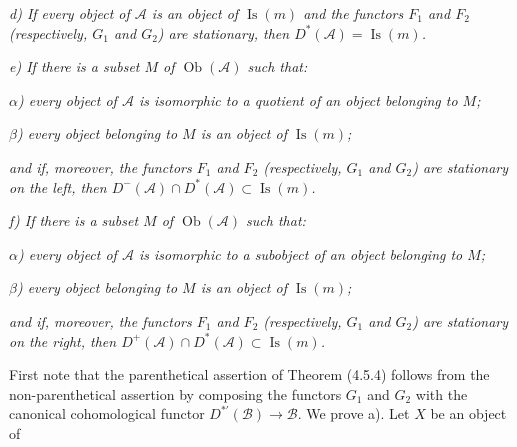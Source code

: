 \noindent\textit{d) If every object of $\mathcal A$ is an object of
$\operatorname{Is}(m)$ and the functors $F_1$ and $F_2$ (respectively,
$G_1$ and $G_2$) are stationary, then
$D^*(\mathcal A)=\operatorname{Is}(m)$.}

\noindent\textit{e) If there is a subset $M$ of
$\operatorname{Ob}(\mathcal A)$ such that:}

\noindent\textit{$\alpha$) every object of $\mathcal A$ is isomorphic to a
quotient of an object belonging to $M$;}

\noindent\textit{$\beta$) every object belonging to $M$ is an object of
$\operatorname{Is}(m)$;}

\noindent\textit{and if, moreover, the functors $F_1$ and $F_2$
(respectively, $G_1$ and $G_2$) are stationary on the left, then
$D^-(\mathcal A)\cap D^*(\mathcal A)\subset\operatorname{Is}(m)$.}

\noindent\textit{f) If there is a subset $M$ of
$\operatorname{Ob}(\mathcal A)$ such that:}

\noindent\textit{$\alpha$) every object of $\mathcal A$ is isomorphic to a
subobject of an object belonging to $M$;}

\noindent\textit{$\beta$) every object belonging to $M$ is an object of
$\operatorname{Is}(m)$;}

\noindent\textit{and if, moreover, the functors $F_1$ and $F_2$
(respectively, $G_1$ and $G_2$) are stationary on the right, then
$D^+(\mathcal A)\cap D^*(\mathcal A)\subset\operatorname{Is}(m)$.}

First note that the parenthetical assertion of Theorem (4.5.4) follows
from the non-parenthetical assertion by composing the functors $G_1$ and
$G_2$ with the canonical cohomological functor
$D^{*'}(\mathcal B)\longrightarrow\mathcal B$. We prove a). Let $X$ be an
object of
\endgroup
